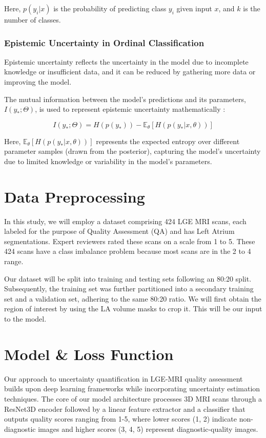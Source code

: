 \documentclass{report}
\begin{document}
Here, \( p(y_i | x) \) is the probability of predicting class \( y_i \) given input \( x \), and \( k \) is the number of classes. 

\subsubsection*{Epistemic Uncertainty in Ordinal Classification}

Epistemic uncertainty reflects the uncertainty in the model due to incomplete knowledge or insufficient data, and it can be reduced by gathering more data or improving the model. 

The mutual information between the model’s predictions and its parameters, \( I(y_*; \Theta) \), is used to represent epistemic uncertainty mathematically \cite{depeweg2018decomposition}:

\[
I(y_*; \Theta) = H(p(y_*)) - \mathbb{E}_{\theta}[H(p(y_* | x, \theta))]
\]

Here, \( \mathbb{E}_{\theta}[H(p(y_* | x, \theta))] \) represents the expected entropy over different parameter samples (drawn from the posterior), capturing the model's uncertainty due to limited knowledge or variability in the model's parameters.

\section*{Data Preprocessing}
In this study, we will employ a dataset comprising 424 LGE MRI scans, each labeled for the purpose of Quality Assessment (QA) and has Left Atrium segmentations.  Expert reviewers rated these scans on a scale from 1 to 5. These 424 scans have a class imbalance problem because most scans are in the 2 to 4 range.

Our dataset will be split into training and testing sets following an 80:20 split. Subsequently, the training set was further partitioned into a secondary training set and a validation set, adhering to the same 80:20 ratio.
We will first obtain the region of interest by using the LA volume masks to crop it. This will be our input to the model.

\section*{Model \& Loss Function}

Our approach to uncertainty quantification in LGE-MRI quality assessment builds upon deep learning frameworks while incorporating uncertainty estimation techniques. The core of our model architecture processes 3D MRI scans through a ResNet3D encoder followed by a linear feature extractor and a classifier that outputs quality scores ranging from 1-5, where lower scores (1, 2) indicate non-diagnostic images and higher scores (3, 4, 5) represent diagnostic-quality images.
\end{document}
